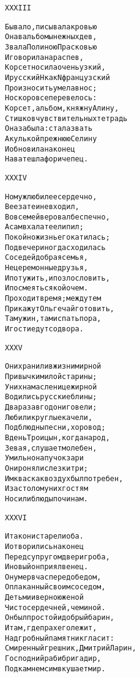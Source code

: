 \begin{minipage}[t]{\dimexpr 0.5\textwidth -\tabcolsep-.5pt}
\begin{alltt}\normalfont\centering
XXXIII

Бывало, писывала кровью
Она в альбомы нежных дев,
Звала Полиною Прасковью
И говорила нараспев,
Корсет носила очень узкий,
И русский Н как N французский
Произносить умела в нос;
Но скоро все перевелось:
Корсет, альбом, княжну Алину,
Стишков чувствительных тетрадь
Она забыла: стала звать
Акулькой прежнюю Селину
И обновила наконец
На вате шлафор и чепец.
\end{alltt}
\end{minipage}

\begin{minipage}[t]{\dimexpr 0.5\textwidth -\tabcolsep-.5pt}
\begin{alltt}\normalfont\centering
XXXIV

Но муж любил ее сердечно,
В ее затеи не входил,
Во всем ей веровал беспечно,
А сам в халате ел и пил;
Покойно жизнь его катилась;
Под вечер иногда сходилась
Соседей добрая семья,
Нецеремонные друзья,
И потужить, и позлословить,
И посмеяться кой о чем.
Проходит время; между тем
Прикажут Ольге чай готовить,
Там ужин, там и спать пора,
И гости едут со двора.
\end{alltt}
\end{minipage}
\clearpage

\begin{minipage}[t]{\dimexpr 0.5\textwidth -\tabcolsep-.5pt}
\begin{alltt}\normalfont\centering
XXXV

Они хранили в жизни мирной
Привычки милой старины;
У них на масленице жирной
Водились русские блины;
Два раза в год они говели;
Любили круглые качели,
Подблюдны песни, хоровод;
В день Троицын, когда народ,
Зевая, слушает молебен,
Умильно на пучок зари
Они роняли слезки три;
Им квас как воздух был потребен,
И за столом у них гостям
Носили блюды по чинам.
\end{alltt}
\end{minipage}

\begin{minipage}[t]{\dimexpr 0.5\textwidth -\tabcolsep-.5pt}
\begin{alltt}\normalfont\centering
XXXVI

И так они старели оба.
И отворились наконец
Перед супругом двери гроба,
И новый он приял венец.
Он умер в час перед обедом,
Оплаканный своим соседом,
Детьми и верною женой
Чистосердечней, чем иной.
Он был простой и добрый барин,
И там, где прах его лежит,
Надгробный памятник гласит:
Смиренный грешник, Дмитрий Ларин,
Господний раб и бригадир,
Под камнем сим вкушает мир.
\end{alltt}
\end{minipage}
\clearpage

